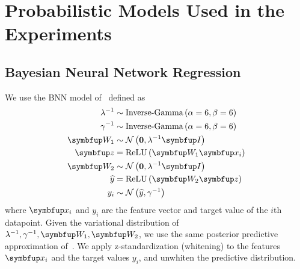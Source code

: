 
\section{Probabilistic Models Used in the Experiments}
\subsection{Bayesian Neural Network Regression}\label{section:bnn}
We use the BNN model of~\citet{pmlr-v37-hernandez-lobatoc15} defined as
\begin{align*}
  \lambda^{-1} &\sim \text{Inverse-Gamma}\left(\alpha=6, \beta=6\right) \\
  \gamma^{-1}  &\sim \text{Inverse-Gamma}\left(\alpha=6, \beta=6\right) \\
  \mW_1       &\sim \mathcal{N}\left(\mathbf{0}, \lambda^{-1} \mI \right) \\
  \vz         &= \mathrm{ReLU}\left(\mW_1 \vx_i\right) \\
  \mW_2       &\sim \mathcal{N}\left(\mathbf{0}, \lambda^{-1} \mI \right) \\
  \widehat{y} &= \mathrm{ReLU}\left(\mW_2 \vz\right) \\
  y_i         &\sim \mathcal{N}\left(\widehat{y}, \gamma^{-1}\right)
\end{align*}
where \(\vx_i\) and \(y_i\) are the feature vector and target value of the \(i\)th datapoint.
Given the variational distribution of \(\lambda^{-1}, \gamma^{-1}, \mW_1, \mW_2\), we use the same posterior predictive approximation of~\citet{pmlr-v37-hernandez-lobatoc15}.
We apply z-standardization (whitening) to the features \(\vx_i\) and the target values \(y_i\), and unwhiten the predictive distribution.


